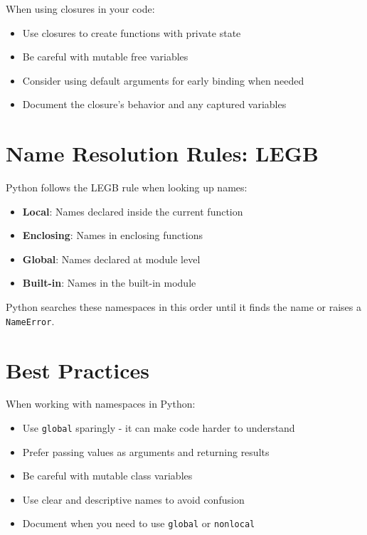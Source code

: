 \documentclass[12pt,letterpaper]{article}
\newcommand{\code}[1]{\texttt{\textcolor{accentColor}{#1}}}
\begin{document}
When using closures in your code:

\begin{itemize}
    \item Use closures to create functions with private state
    \item Be careful with mutable free variables
    \item Consider using default arguments for early binding when needed
    \item Document the closure's behavior and any captured variables
\end{itemize}

\section{Name Resolution Rules: LEGB}

Python follows the LEGB rule when looking up names:

\begin{itemize}
    \item \textbf{Local}: Names declared inside the current function
    \item \textbf{Enclosing}: Names in enclosing functions
    \item \textbf{Global}: Names declared at module level
    \item \textbf{Built-in}: Names in the built-in module
\end{itemize}

Python searches these namespaces in this order until it finds the name or raises a \code{NameError}.

\section{Best Practices}

When working with namespaces in Python:

\begin{itemize}
    \item Use \code{global} sparingly - it can make code harder to understand
    \item Prefer passing values as arguments and returning results
    \item Be careful with mutable class variables
    \item Use clear and descriptive names to avoid confusion
    \item Document when you need to use \code{global} or \code{nonlocal}
\end{itemize}
\end{document}

